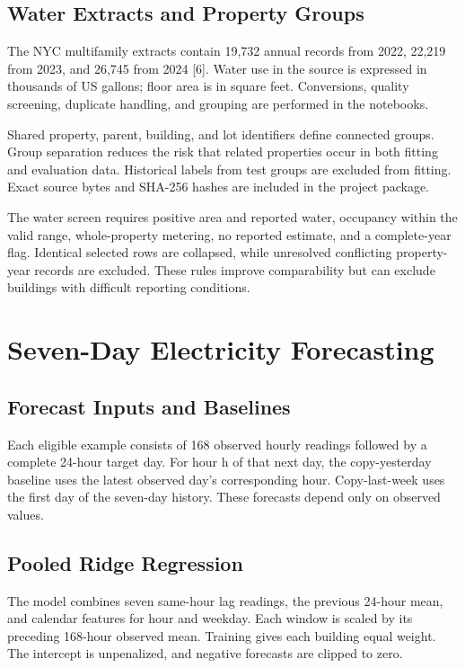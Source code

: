 \documentclass[12pt,a4paper]{article}
\begin{document}
\subsection{Water Extracts and Property Groups}
The NYC multifamily extracts contain 19,732 annual records from 2022, 22,219 from 2023, and 26,745 from 2024 [6]. Water use in the source is expressed in thousands of US gallons; floor area is in square feet. Conversions, quality screening, duplicate handling, and grouping are performed in the notebooks.

Shared property, parent, building, and lot identifiers define connected groups. Group separation reduces the risk that related properties occur in both fitting and evaluation data. Historical labels from test groups are excluded from fitting. Exact source bytes and SHA-256 hashes are included in the project package.

The water screen requires positive area and reported water, occupancy within the valid range, whole-property metering, no reported estimate, and a complete-year flag. Identical selected rows are collapsed, while unresolved conflicting property-year records are excluded. These rules improve comparability but can exclude buildings with difficult reporting conditions.

\newpage
\section{Seven-Day Electricity Forecasting}
\subsection{Forecast Inputs and Baselines}
Each eligible example consists of 168 observed hourly readings followed by a complete 24-hour target day. For hour h of that next day, the copy-yesterday baseline uses the latest observed day's corresponding hour. Copy-last-week uses the first day of the seven-day history. These forecasts depend only on observed values.

\subsection{Pooled Ridge Regression}
The model combines seven same-hour lag readings, the previous 24-hour mean, and calendar features for hour and weekday. Each window is scaled by its preceding 168-hour observed mean. Training gives each building equal weight. The intercept is unpenalized, and negative forecasts are clipped to zero.
\end{document}
